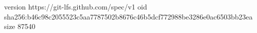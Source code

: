 version https://git-lfs.github.com/spec/v1
oid sha256:b46c98c2055523c5aa7787502b8676c46b5dcf772988be3286e0ac6503bb23ea
size 87540
